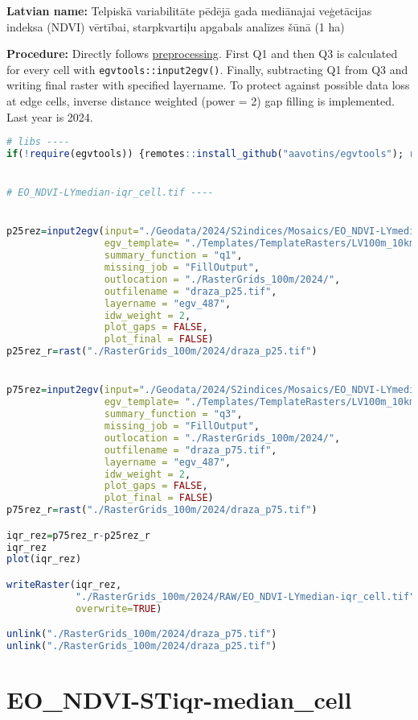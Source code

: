 \documentclass[
]{book}
\newcommand{\passthrough}[1]{#1}
\begin{document}
\textbf{Latvian name:} Telpiskā variabilitāte pēdējā gada mediānajai veģetācijas indeksa (NDVI) vērtībai, starpkvartiļu apgabals analīzes šūnā (1 ha)

\textbf{Procedure:} Directly follows \hyperref[Ch04.13]{preprocessing}. First Q1 and then Q3
is calculated for every cell with \passthrough{\lstinline!egvtools::input2egv()!}. Finally, subtracting
Q1 from Q3 and writing final raster with specified layername. To protect against possible data loss at edge cells,
inverse distance weighted (power = 2) gap filling is implemented. Last year is 2024.

\begin{lstlisting}[language=R]
# libs ----
if(!require(egvtools)) {remotes::install_github("aavotins/egvtools"); require(egvtools)}


# EO_NDVI-LYmedian-iqr_cell.tif ----


p25rez=input2egv(input="./Geodata/2024/S2indices/Mosaics/EO_NDVI-LYmedian.tif",
                 egv_template= "./Templates/TemplateRasters/LV100m_10km.tif",
                 summary_function = "q1",
                 missing_job = "FillOutput",
                 outlocation = "./RasterGrids_100m/2024/",
                 outfilename = "draza_p25.tif",
                 layername = "egv_487",
                 idw_weight = 2,
                 plot_gaps = FALSE,
                 plot_final = FALSE)
p25rez_r=rast("./RasterGrids_100m/2024/draza_p25.tif")


p75rez=input2egv(input="./Geodata/2024/S2indices/Mosaics/EO_NDVI-LYmedian.tif",
                 egv_template= "./Templates/TemplateRasters/LV100m_10km.tif",
                 summary_function = "q3",
                 missing_job = "FillOutput",
                 outlocation = "./RasterGrids_100m/2024/",
                 outfilename = "draza_p75.tif",
                 layername = "egv_487",
                 idw_weight = 2,
                 plot_gaps = FALSE,
                 plot_final = FALSE)
p75rez_r=rast("./RasterGrids_100m/2024/draza_p75.tif")

iqr_rez=p75rez_r-p25rez_r
iqr_rez
plot(iqr_rez)

writeRaster(iqr_rez,
            "./RasterGrids_100m/2024/RAW/EO_NDVI-LYmedian-iqr_cell.tif",
            overwrite=TRUE)

unlink("./RasterGrids_100m/2024/draza_p75.tif")
unlink("./RasterGrids_100m/2024/draza_p25.tif")
\end{lstlisting}

\section{EO\_NDVI-STiqr-median\_cell}\label{ch06.488}
\end{document}
